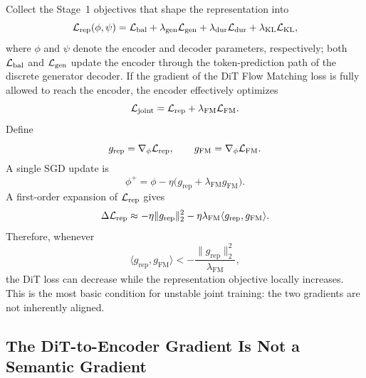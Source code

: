 Collect the Stage~1 objectives that shape the representation into
\begin{equation}
    \mathcal{L}_{\mathrm{rep}}(\phi,\psi)
    =
    \mathcal{L}_{\mathrm{bal}}
    +\lambda_{\mathrm{gen}}\mathcal{L}_{\mathrm{gen}}
    +\lambda_{\mathrm{dur}}\mathcal{L}_{\mathrm{dur}}
    +\lambda_{\mathrm{KL}}\mathcal{L}_{\mathrm{KL}},
    \label{eq:app-rep-objective}
\end{equation}
where $\phi$ and $\psi$ denote the encoder and decoder parameters, respectively; both $\mathcal{L}_{\mathrm{bal}}$ and $\mathcal{L}_{\mathrm{gen}}$ update the encoder through the token-prediction path of the discrete generator decoder. If the gradient of the DiT Flow Matching loss is fully allowed to reach the encoder, the encoder effectively optimizes
\begin{equation}
    \mathcal{L}_{\mathrm{joint}}
    =
    \mathcal{L}_{\mathrm{rep}}
    +\lambda_{\mathrm{FM}}\mathcal{L}_{\mathrm{FM}}.
    \label{eq:app-joint-objective}
\end{equation}
Define
\begin{equation}
    g_{\mathrm{rep}}=\nabla_\phi\mathcal{L}_{\mathrm{rep}},
    \qquad
    g_{\mathrm{FM}}=\nabla_\phi\mathcal{L}_{\mathrm{FM}}.
    \label{eq:app-two-gradients}
\end{equation}
A single SGD update is
\begin{equation}
    \phi^{+}
    =
    \phi-\eta\big(g_{\mathrm{rep}}+\lambda_{\mathrm{FM}}g_{\mathrm{FM}}\big).
    \label{eq:app-joint-update}
\end{equation}
A first-order expansion of $\mathcal{L}_{\mathrm{rep}}$ gives
\begin{equation}
    \Delta\mathcal{L}_{\mathrm{rep}}
    \approx
    -\eta\|g_{\mathrm{rep}}\|_2^2
    -\eta\lambda_{\mathrm{FM}}
    \langle g_{\mathrm{rep}},g_{\mathrm{FM}}\rangle .
\label{eq:app-gradient-conflict}
\end{equation}
Therefore, whenever
\begin{equation}
    \langle g_{\mathrm{rep}},g_{\mathrm{FM}}\rangle
    <
    -\frac{\|g_{\mathrm{rep}}\|_2^2}{\lambda_{\mathrm{FM}}},
    \label{eq:app-conflict-condition}
\end{equation}
the DiT loss can decrease while the representation objective locally increases. This is the most basic condition for unstable joint training: the two gradients are not inherently aligned.

\subsection{The DiT-to-Encoder Gradient Is Not a Semantic Gradient}

